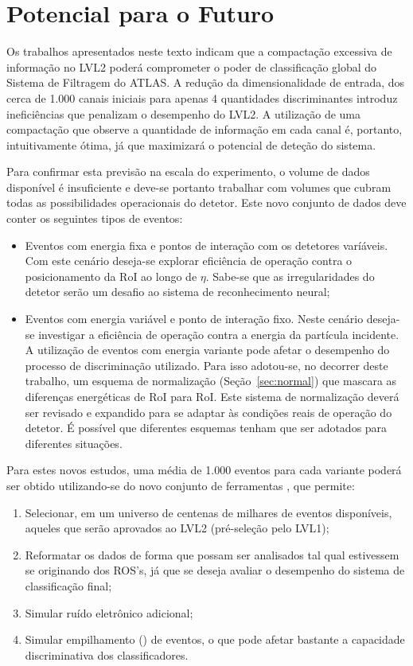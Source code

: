 \section{Potencial para o Futuro}

Os trabalhos apresentados neste texto indicam que a compactação excessiva de
informação no LVL2 poderá comprometer o poder de classificação global do
Sistema de Filtragem do ATLAS. A redução da dimensionalidade de entrada, dos
cerca de 1.000 canais iniciais para apenas 4 quantidades discriminantes
introduz ineficiências que penalizam o desempenho do LVL2. A utilização de uma
compactação que observe a quantidade de informação em cada canal é, portanto,
intuitivamente ótima, já que maximizará o potencial de deteção do sistema.

Para confirmar esta previsão na escala do experimento, o volume de dados
disponível é insuficiente e deve-se portanto trabalhar com volumes que cubram
todas as possibilidades operacionais do detetor. Este novo conjunto de dados
deve conter os seguintes tipos de eventos:

\begin{itemize}
\item Eventos com energia fixa e pontos de interação com os detetores
varíáveis. Com este cenário deseja-se explorar eficiência de operação contra o
posicionamento da RoI ao longo de $\eta$. Sabe-se que as irregularidades do
detetor serão um desafio ao sistema de reconhecimento neural;

\item Eventos com energia variável e ponto de interação fixo. Neste cenário
deseja-se investigar a eficiência de operação contra a energia da partícula
incidente. A utilização de eventos com energia variante pode afetar o
desempenho do processo de discriminação utilizado. Para isso adotou-se, no
decorrer deste trabalho, um esquema de normalização (Seção~\ref{sec:normal})
que mascara as diferenças energéticas de RoI para RoI. Este sistema de
normalização deverá ser revisado e expandido para se adaptar às condições
reais de operação do detetor. É possível que diferentes esquemas tenham que
ser adotados para diferentes situações.
\end{itemize}

Para estes novos estudos, uma média de 1.000 eventos para cada variante poderá
ser obtido utilizando-se do novo conjunto de ferramentas 
\cite{athena:home-page}, que permite:

\begin{enumerate}
\item Selecionar, em um universo de centenas de milhares de eventos
disponíveis, aqueles que serão aprovados ao LVL2 (pré-seleção pelo LVL1);
\item Reformatar os dados de forma que possam ser analisados tal qual
estivessem se originando dos ROS's, já que se deseja avaliar o desempenho do
sistema de classificação final;
\item Simular ruído eletrônico adicional;
\item Simular empilhamento () de eventos, o que pode afetar
bastante a capacidade discriminativa dos classificadores.
\end{enumerate}

